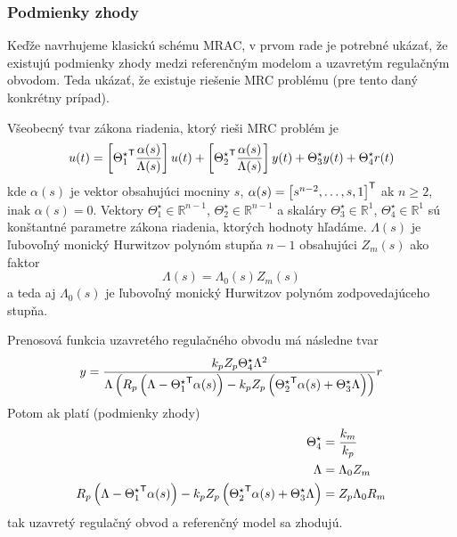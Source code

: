 \documentclass[a4paper, 10pt, ]{article}
\begin{document}
\subsubsection{Podmienky zhody}

Keďže navrhujeme klasickú schému MRAC, v prvom rade je potrebné ukázať, že existujú podmienky zhody medzi referenčným modelom a uzavretým regulačným obvodom. Teda ukázať, že existuje riešenie MRC problému (pre tento daný konkrétny prípad).

Všeobecný tvar zákona riadenia, ktorý rieši MRC problém je
\begin{equation} \label{generalControlLaw_03}
    u(t) =
    \left[{\Theta_1^\star}^{\mathsf{T}} \frac{\alpha(s)}{\Lambda(s)}\right] u(t)
    + \left[{\Theta_2^\star}^{\mathsf{T}} \frac{\alpha(s)}{\Lambda(s)}\right] y(t)
    + \Theta_3^\star y(t) + \Theta_4^\star r(t)
\end{equation}
kde $\alpha(s)$ je vektor obsahujúci mocniny $s$, $\alpha(s) = \begin{bmatrix} s^{n-2}, \ldots,s, 1 \end{bmatrix}^{\mathsf{T}}$ ak $n\geq 2$, inak $\alpha(s) = 0$. Vektory $\Theta_1^\star \in \mathbb{R}^{n-1}$, $\Theta_2^\star \in \mathbb{R}^{n-1}$ a skaláry $\Theta_3^\star \in \mathbb{R}^1$, $\Theta_4^\star \in \mathbb{R}^1$ sú konštantné parametre zákona riadenia, ktorých hodnoty hľadáme.  $\Lambda(s)$ je ľubovoľný monický Hurwitzov polynóm stupňa $n-1$ obsahujúci $Z_m(s)$ ako faktor
\begin{equation}
	\Lambda(s) = \Lambda_0(s) Z_m(s)
\end{equation}
a teda aj $\Lambda_0(s)$ je ľubovoľný monický Hurwitzov polynóm zodpovedajúceho stupňa.


Prenosová funkcia uzavretého regulačného obvodu má následne tvar
\begin{equation}
	y
	=
	\frac{
		k_p
		Z_p
		\Theta_4^\star
		\Lambda^2
		}{
		\Lambda
		\left(
			R_p
			\left(
				\Lambda - {\Theta_1^\star}^{\mathsf{T}}	\alpha(s)
			\right)
			-
			k_p
			Z_p
			\left(
				{\Theta_2^\star}^{\mathsf{T}}	\alpha(s)
				+
				\Theta_3^\star \Lambda
			\right)
		\right)}
	r
\end{equation}
Potom ak platí (podmienky zhody)
\begin{subequations} \label{prezpodmzhod}
	\begin{align}
		\Theta_4^\star &= \frac{k_m}{k_p} \label{idealTheta4_03a} \\
		\Lambda &= \Lambda_0 Z_m \label{lambda_03a} \\
		R_p
		\left(
			\Lambda - {\Theta_1^\star}^{\mathsf{T}} \alpha(s)
		\right)
		-
		k_p
		Z_p
		\left(
			{\Theta_2^\star}^{\mathsf{T}} \alpha(s)
			+
			\Theta_3^\star \Lambda
		\right)
	    &=
	    Z_p
	    \Lambda_0
	    R_m
	\end{align}
\end{subequations}
tak uzavretý regulačný obvod a referenčný model sa zhodujú.
\end{document}
